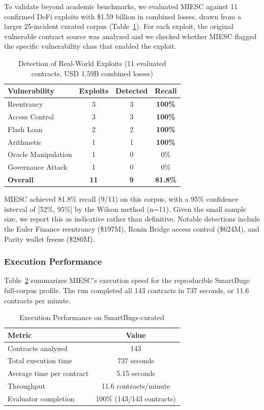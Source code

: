 \documentclass[conference]{IEEEtran}
\begin{document}
To validate beyond academic benchmarks, we evaluated MIESC against 11 confirmed DeFi exploits with \$1.59 billion in combined losses, drawn from a larger 25-incident curated corpus (Table~\ref{tab:exploits}). For each exploit, the original vulnerable contract source was analyzed and we checked whether MIESC flagged the specific vulnerability class that enabled the exploit.

\begin{table}[htbp]
\caption{Detection of Real-World Exploits (11 evaluated contracts, USD 1.59B combined losses)}
\label{tab:exploits}
\centering
\begin{tabular}{@{}lccc@{}}
\toprule
\textbf{Vulnerability} & \textbf{Exploits} & \textbf{Detected} & \textbf{Recall} \\
\midrule
Reentrancy & 3 & 3 & \textbf{100\%} \\
Access Control & 3 & 3 & \textbf{100\%} \\
Flash Loan & 2 & 2 & \textbf{100\%} \\
Arithmetic & 1 & 1 & \textbf{100\%} \\
Oracle Manipulation & 1 & 0 & 0\% \\
Governance Attack & 1 & 0 & 0\% \\
\midrule
\textbf{Overall} & \textbf{11} & \textbf{9} & \textbf{81.8\%} \\
\bottomrule
\end{tabular}
\end{table}

MIESC achieved 81.8\% recall (9/11) on this corpus, with a 95\% confidence interval of [52\%, 95\%] by the Wilson method (n=11). Given the small sample size, we report this as indicative rather than definitive. Notable detections include the Euler Finance reentrancy (\$197M), Ronin Bridge access control (\$624M), and Parity wallet freeze (\$280M).

\subsubsection{Execution Performance}

Table~\ref{tab:performance} summarizes MIESC's execution speed for the reproducible SmartBugs full-corpus profile. The run completed all 143 contracts in 737 seconds, or 11.6 contracts per minute.

\begin{table}[htbp]
\caption{Execution Performance on SmartBugs-curated}
\label{tab:performance}
\centering
\begin{tabular}{@{}lc@{}}
\toprule
\textbf{Metric} & \textbf{Value} \\
\midrule
Contracts analyzed & 143 \\
Total execution time & 737 seconds \\
Average time per contract & 5.15 seconds \\
Throughput & 11.6 contracts/minute \\
Evaluator completion & 100\% (143/143 contracts) \\
\bottomrule
\end{tabular}
\end{table}
\end{document}
